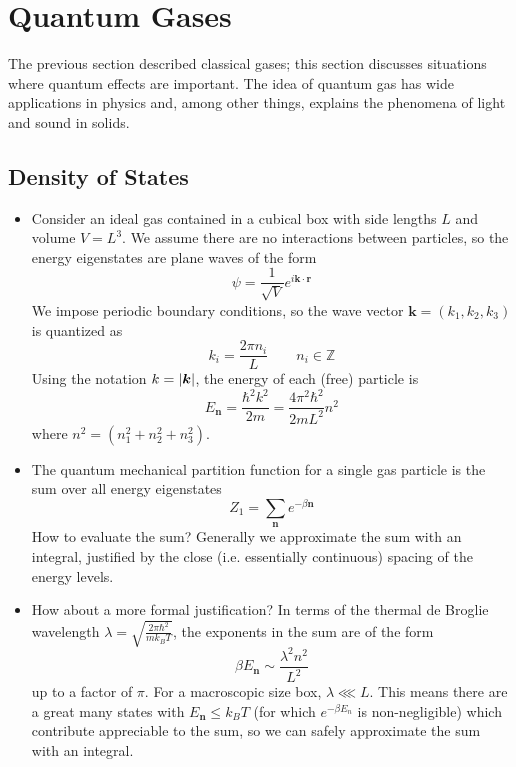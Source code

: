 \documentclass[11pt, a4paper]{article}
\begin{document}
\section{Quantum Gases}
The previous section described classical gases; this section discusses situations where quantum effects are important. The idea of quantum gas has wide applications in physics and, among other things, explains the phenomena of light and sound in solids.

\subsection{Density of States}
\begin{itemize}
	\item Consider an ideal gas contained in a cubical box with side lengths $ L $ and volume $ V = L^{3}$. We assume there are no interactions between particles, so the energy eigenstates are plane waves of the form
	\begin{equation*}
		\psi = \frac{1}{\sqrt{V}}e^{i\bm{k}\cdot \bm{r}}
	\end{equation*}
	We impose periodic boundary conditions, so the wave vector $ \bm{k} = (k_{1}, k_{2}, k_{3}) $  is quantized as
	\begin{equation*}
		k_{i} = \frac{2\pi n_{i}}{L} \qquad n_{i} \in \mathbb{Z}
	\end{equation*}
	Using the notation $ k = \abs{\bm{k}} $, the energy of each (free) particle is
	\begin{equation*}
		E_{\bm{n}} = \frac{\hbar^{2}k^{2}}{2m} = \frac{4\pi^{2}\hbar^{2}}{2mL^{2}}n^{2}
	\end{equation*}
	where $ n^{2} = (n_{1}^{2} + n_{2}^{2} + n_{3}^{2}) $.
	
	\item The quantum mechanical partition function for a single gas particle is the sum over all energy eigenstates
	\begin{equation*}
		Z_{1} = \sum_{\bm{n}}e^{-\beta \bm{n}}
	\end{equation*}
	How to evaluate the sum? Generally we approximate the sum with an integral, justified by the close (i.e. essentially continuous) spacing of the energy levels.
	
	\item How about a more formal justification? In terms of the thermal de Broglie wavelength $ \lambda = \sqrt{\frac{2\pi \hbar^{2}}{mk_{B}T}} $, the exponents in the sum are of the form 
	\begin{equation*}
		\beta E_{\bm{n}} \sim \frac{\lambda^{2}n^{2}}{L^{2}}
	\end{equation*}
	up to a factor of $ \pi $. For a macroscopic size box, $ \lambda \lll L $. This means there are a great many states with $ E_{\bm{n}} \leq k_{B}T $ (for which $ e^{-\beta E_{n}} $ is non-negligible) which contribute appreciable to the sum, so we can safely approximate the sum with an integral. 
	

\end{itemize}
\end{document}
